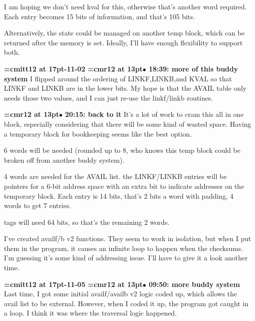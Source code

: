 I am hoping we don't need kval for this, otherwise that's another word required. Each entry becomes 15 bits of information, and that's 105 bits.
\par

Alternatively, the state could be managed on another temp block, which can be returned after the memory is set. Ideally, I'll have enough flexibility to support both.
\par

{\medskip\noindent\bf\font\titlefont=cmitt12 at 17pt-11-02}\medskip
{\smallskip\noindent\bf\font\titlefont=cmr12 at 13pt\titlefont $\bullet$ 18:39: more of this buddy system}\smallskip
I flipped around the ordering of LINKF,LINKB,and KVAL so that LINKF and LINKB are in the lower bits. My hope is that the AVAIL table only needs those two values, and I can just re-use the linkf/linkb routines.
\par

{\smallskip\noindent\bf\font\titlefont=cmr12 at 13pt\titlefont $\bullet$ 20:15: back to it}\smallskip
It's a lot of work to cram this all in one block, especially considering that there will be some kind of wasted space. Having a temporary block for bookkeeping seems like the best option.
\par

6 words will be needed (rounded up to 8, who knows this temp block could be broken off from another buddy system).
\par

4 words are needed for the AVAIL list. the LINKF/LINKB entries will be pointers for a 6-bit address space with an extra bit to indicate addresses on the temporary block. Each entry is 14 bits, that's 2 bits a word with padding, 4 words to get 7 entries.
\par

tags will need 64 bits, so that's the remaining 2 words.
\par

I've created availf/b v2 functions. They seem to work in isolation, but when I put them in the program, it causes an infinite loop to happen when the checksums. I'm guessing it's some kind of addressing issue. I'll have to give it a look another time.
\par

{\medskip\noindent\bf\font\titlefont=cmitt12 at 17pt-11-05}\medskip
{\smallskip\noindent\bf\font\titlefont=cmr12 at 13pt\titlefont $\bullet$ 09:50: more buddy system}\smallskip
Last time, I got some initial availf/availb v2 logic coded up, which allows the avail list to be external. However, when I coded it up, the program got caught in a loop. I think it was where the traversal logic happened.
\par

